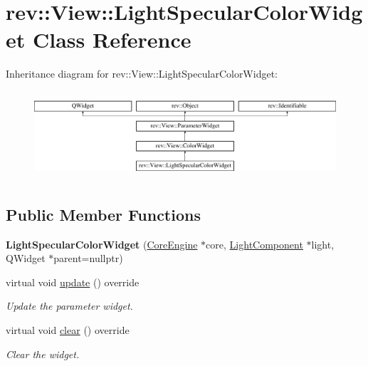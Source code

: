 \hypertarget{classrev_1_1_view_1_1_light_specular_color_widget}{}\section{rev\+::View\+::Light\+Specular\+Color\+Widget Class Reference}
\label{classrev_1_1_view_1_1_light_specular_color_widget}
Inheritance diagram for rev\+::View\+::Light\+Specular\+Color\+Widget\+:\begin{figure}[H]
\begin{center}
\leavevmode
\includegraphics[height=3.303835cm]{classrev_1_1_view_1_1_light_specular_color_widget}
\end{center}
\end{figure}
\subsection*{Public Member Functions}
\begin{DoxyCompactItemize}
\item 
\mbox{\label{classrev_1_1_view_1_1_light_specular_color_widget_a458ffe89c42a0a674c893bae97f20f17}} 
{\bfseries Light\+Specular\+Color\+Widget} (\mbox{\hyperlink{classrev_1_1_core_engine}{Core\+Engine}} $\ast$core, \mbox{\hyperlink{classrev_1_1_light_component}{Light\+Component}} $\ast$light, Q\+Widget $\ast$parent=nullptr)
\item 
\mbox{\label{classrev_1_1_view_1_1_light_specular_color_widget_a94a03e9adc8b07038c8c0a986fb67d2e}} 
virtual void \mbox{\hyperlink{classrev_1_1_view_1_1_light_specular_color_widget_a94a03e9adc8b07038c8c0a986fb67d2e}{update}} () override
\begin{DoxyCompactList}\small\item\em Update the parameter widget. \end{DoxyCompactList}\item 
\mbox{\label{classrev_1_1_view_1_1_light_specular_color_widget_ae3f684aadcb1e4be693dfd0bb2d3afea}} 
virtual void \mbox{\hyperlink{classrev_1_1_view_1_1_light_specular_color_widget_ae3f684aadcb1e4be693dfd0bb2d3afea}{clear}} () override
\begin{DoxyCompactList}\small\item\em Clear the widget. \end{DoxyCompactList}\end{DoxyCompactItemize}
